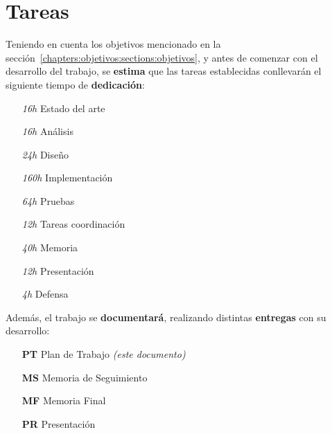 \section{Tareas} \label{chapters:tareas:sections:tareas}

Teniendo en cuenta los objetivos mencionado en la sección~\ref{chapters:objetivos:sections:objetivos}, y antes de comenzar con el desarrollo del trabajo, se \textbf{estima} que las tareas establecidas conllevarán el siguiente tiempo de \textbf{dedicación}:

\begin{multicols}{3}[\vspace{-0.5em}]
    \begin{itemize}[leftmargin=2.5em, itemsep=0em]
        \item [\textit{16h}] Estado del arte
        \item [\textit{16h}] Análisis
        \item [\textit{24h}] Diseño
        \item [\textit{160h}] Implementación
        \item [\textit{64h}] Pruebas
        \item [\textit{12h}] Tareas coordinación
        \item [\textit{40h}] Memoria
        \item [\textit{12h}] Presentación
        \item [\textit{4h}] Defensa
    \end{itemize}
\end{multicols}

Además, el trabajo se \textbf{documentará}, realizando distintas \textbf{entregas} con su desarrollo:

\begin{multicols}{2}[\vspace{-0.5em}]
    \begin{enumerate}[leftmargin=3em, itemsep=0em]
        \item [\textbf{PT}] Plan de Trabajo \textcolor{black!35}{\textit{(este documento)}}
        \item [\textbf{MS}] Memoria de Seguimiento
        \item [\textbf{MF}] Memoria Final
        \item [\textbf{PR}] Presentación
    \end{enumerate}
\end{multicols}
        

